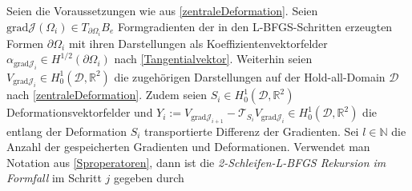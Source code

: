 \begin{defi}
	Seien die Voraussetzungen wie aus \ref{zentraleDeformation}. Seien $\text{grad}\mathcal{J}(\Omega_i) \in T_{\partial\Omega_i}B_e$ Formgradienten der in den L-BFGS-Schritten erzeugten Formen $\partial\Omega_i$ mit ihren Darstellungen als Koeffizientenvektorfelder $\alpha_{\text{grad}\mathcal{J}_i} \in H^{1/2}(\partial\Omega_i)$ nach \ref{Tangentialvektor}. Weiterhin seien $V_{\text{grad}\mathcal{J}_i} \in H^1_0(\mathcal{D}, \mathbb{R}^2)$ die zugehörigen Darstellungen auf der Hold-all-Domain $\mathcal{D}$ nach \ref{zentraleDeformation}. Zudem seien $S_i \in H^1_0(\mathcal{D}, \mathbb{R}^2)$ Deformationsvektorfelder und $Y_i := V_{\text{grad}\mathcal{J}_{i+1}} - \mathcal{T}_{S_i}V_{\text{grad}\mathcal{J}_i} \in H^1_0(\mathcal{D}, \mathbb{R}^2)$ die entlang der Deformation $S_i$ transportierte Differenz der Gradienten. Sei $l \in \mathbb{N}$ die Anzahl der gespeicherten Gradienten und Deformationen. Verwendet man Notation aus \ref{Sproperatoren}, dann ist die \textit{2-Schleifen-L-BFGS Rekursion im Formfall} im Schritt $j$ gegeben durch 


\end{defi}
